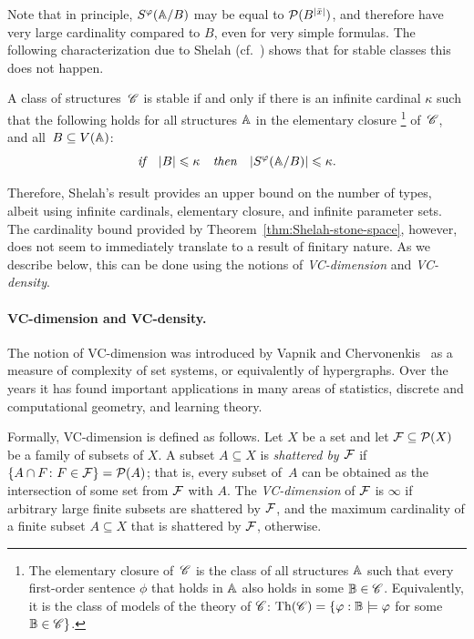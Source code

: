 Note that in principle, $S^\varphi(\mathbb A/B)$ may be equal to
$\mathcal{P}(B^{|\bar x|})$, and therefore have very large cardinality
compared to $B$, even for very simple formulas.  The following
characterization due to Shelah (cf.~\cite[Theorem 2.2, Chapter
II]{shelah1990classification}) shows that for stable classes this does
not happen.
\begin{theorem}\label{thm:Shelah-stone-space}
  A class of structures\, $\mathscr{C}$ is stable if and only if there is an
  infinite cardinal $\kappa$ such that the following holds for all
  structures $\mathbb A$ in the elementary closure \footnote{The
    elementary closure of\, $\mathscr{C}$ is the class of all structures
    $\mathbb A$ such that every first-order sentence $\phi$ that holds in
    $\mathbb A$ also holds in some $\mathbb B\in \mathscr{C}$. Equivalently, it is
    the class of models of the theory of $\mathscr{C}$:
    $\mathrm{Th}(\mathscr{C})=\{\varphi : \mathbb B\models\varphi$ for some
    $\mathbb B \in \mathscr{C}\}$.} of\, $\mathscr{C}$, and all~$B\subseteq V(\mathbb A)$:
$$  \textit{if\quad}|B|\leqslant \kappa\textit {\quad then\quad}
|S^\varphi(\mathbb A/B)|\leqslant \kappa.$$
\end{theorem}
Therefore, Shelah's result provides an upper bound on the number of
types, albeit using infinite cardinals, elementary closure, and
infinite parameter sets.  The cardinality bound provided by
Theorem~\ref{thm:Shelah-stone-space}, however, does not seem to
immediately translate to a result of finitary nature. As we describe
below, this can be done using the notions of {\em{VC-dimension}} and
{\em{VC-density}}.

\paragraph{VC-dimension and VC-density.} 
The notion of VC-dimension was introduced by Vapnik and
Chervonenkis~\cite{chervonenkis1971theory} as a measure of complexity
of set systems, or equivalently of hypergraphs.  Over the years it has
found important applications in many areas of statistics, discrete and
computational geometry, and learning theory.

Formally, VC-dimension is defined as follows.  Let $X$ be a set and
let $\mathcal{F}\subseteq \mathcal{P}(X)$ be a family of subsets of $X$.  A subset
$A\subseteq X$ is \emph{shattered by $\mathcal{F}$} if
$\{A\cap F\colon F\in \mathcal{F}\}=\mathcal{P}(A)$; that is, every subset of~$A$
can be obtained as the intersection of some set from $\mathcal{F}$ with $A$.
The \emph{VC-dimension} of $\mathcal{F}$ is $\infty$ if arbitrary large
finite subsets are shattered by $\mathcal{F}$, and the maximum cardinality of
a finite subset $A\subseteq X$ that is shattered by $\mathcal{F}$, otherwise.

